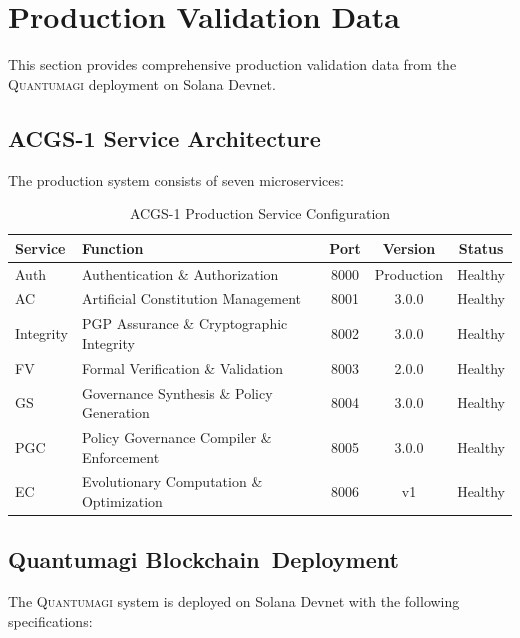 \documentclass[10pt,twocolumn]{article}
\newcommand{\quantumagi}{\textsc{Quantumagi}}
\theoremstyle{definition}
\begin{document}
\section{Production Validation Data}
\label{sec:appendix_production}
This section provides comprehensive production validation data from the \quantumagi{} deployment on Solana Devnet.

\subsection{ACGS-1 Service Architecture}
The production system consists of seven microservices:

\begin{table}[H]
\centering
\caption{ACGS-1 Production Service Configuration}
\label{tab:acgs_services}
\begin{tabular}{@{}llccc@{}}
\toprule
\textbf{Service} & \textbf{Function} & \textbf{Port} & \textbf{Version} & \textbf{Status} \\
\midrule
Auth & Authentication \& Authorization & 8000 & Production & Healthy \\
AC & Artificial Constitution Management & 8001 & 3.0.0 & Healthy \\
Integrity & PGP Assurance \& Cryptographic Integrity & 8002 & 3.0.0 & Healthy \\
FV & Formal Verification \& Validation & 8003 & 2.0.0 & Healthy \\
GS & Governance Synthesis \& Policy Generation & 8004 & 3.0.0 & Healthy \\
PGC & Policy Governance Compiler \& Enforcement & 8005 & 3.0.0 & Healthy \\
EC & Evolutionary Computation \& Optimization & 8006 & v1 & Healthy \\
\bottomrule
\end{tabular}
\end{table}

\subsection{Quantumagi Blockchain~Deployment}
The \quantumagi{} system is deployed on Solana Devnet with the following specifications:
\end{document}
